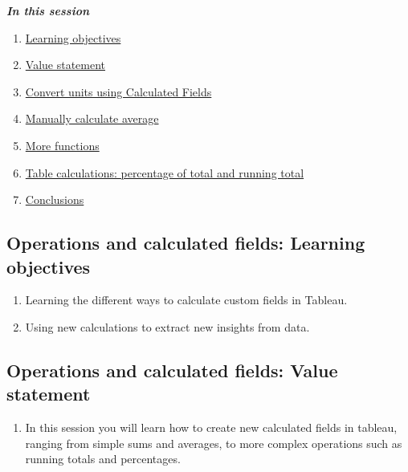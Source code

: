 \documentclass[
]{book}
\providecommand{\tightlist}{%
  \setlength{\itemsep}{0pt}\setlength{\parskip}{0pt}}
\begin{document}
\textbf{\emph{In this session}}

\begin{enumerate}
\def\labelenumi{\arabic{enumi}.}
\tightlist
\item
  \protect\hyperlink{operations-and-calculated-fields-learning-objectives}{Learning objectives}
\item
  \protect\hyperlink{operations-and-calculated-fields-value-statement}{Value statement}
\item
  \protect\hyperlink{convert-units-using-calculated-fields}{Convert units using Calculated Fields}
\item
  \protect\hyperlink{manually-calculate-average}{Manually calculate average}
\item
  \protect\hyperlink{more-functions}{More functions}
\item
  \protect\hyperlink{table-calculations-percentage-of-total-and-running-total}{Table calculations: percentage of total and running total}
\item
  \protect\hyperlink{operations-and-calculated-fields-conclusions}{Conclusions}
\end{enumerate}

\hypertarget{operations-and-calculated-fields-learning-objectives}{%
\subsection{Operations and calculated fields: Learning objectives}\label{operations-and-calculated-fields-learning-objectives}}

\begin{enumerate}
\def\labelenumi{\arabic{enumi}.}
\tightlist
\item
  Learning the different ways to calculate custom fields in Tableau.
\item
  Using new calculations to extract new insights from data.
\end{enumerate}

\hypertarget{operations-and-calculated-fields-value-statement}{%
\subsection{Operations and calculated fields: Value statement}\label{operations-and-calculated-fields-value-statement}}

\begin{enumerate}
\def\labelenumi{\arabic{enumi}.}
\tightlist
\item
  In this session you will learn how to create new calculated fields in tableau, ranging from simple sums and averages, to more complex operations such as running totals and percentages.
\end{enumerate}
\end{document}
